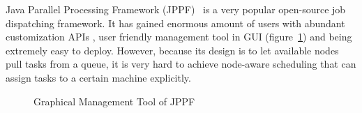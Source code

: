 Java Parallel Processing Framework (JPPF)~\cite{cite:JPPF} is a very
popular open-source job dispatching framework.
It has gained enormous amount of users with abundant customization APIs
, user friendly management tool in GUI
(figure~\ref{fig:jppf-management-tool}) and being extremely easy to
deploy.
However, because its design is to let available nodes pull tasks from a
queue, it is very hard to achieve node-aware scheduling that can assign
tasks to a certain machine explicitly.
\begin{figure}[htpb]
  \centering
  \caption{Graphical Management Tool of JPPF}
  \label{fig:jppf-management-tool}
\end{figure}
